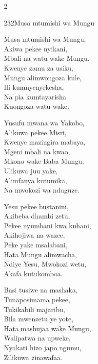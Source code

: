 \documentclass{article}
\begin{document}
\begin{multicols}{2}
\begin{hymn}{232}{Musa mtumishi wa Mungu}{}
\begin{stanza}
Musa mtumishi wa Mungu,\\
Akiwa pekee nyikani,\\
Mbali na watu wake Mungu,\\
Kwenye zamu za usiku,\\
Mungu alimwongoza kule,\\
Ili kumnyenyekesha,\\
Na pia kumtayarisha\\
Kuongoza watu wake.
\end{stanza}
\begin{stanza}
Yusufu mwana wa Yakobo,\\
Alikuwa pekee Misri,\\
Kwenye mazingira mabaya,\\
Mgeni mbali na kwao,\\
Mkono wake Baba Mungu,\\
Ulikuwa juu yake,\\
Alimfanya kutumika,\\
Na mwokozi wa nduguze.
\end{stanza}
\begin{stanza}
Yesu pekee bustanini,\\
Akibeba dhambi zetu,\\
Pekee nyumbani kwa kuhani,\\
Akihojiwa na wazee,\\
Peke yake msalabani,\\
Hata Mungu alimwacha,\\
Ndiye Yesu, Mwokozi wetu,\\
Akafa kutukomboa.
\end{stanza}
\begin{stanza}
Basi tusiwe na mashaka,\\
Tunaposimama pekee,\\
Tukikabili majaribu,\\
Bila mwenzetu ye yote,\\
Hata mashujaa wake Mungu,\\
Walipatwa na upweke,\\
Nyakati hizo japo ngumu,\\
Zilikuwa zinawafaa.
\end{stanza}
\end{hymn}


\end{multicols}
\end{document}

